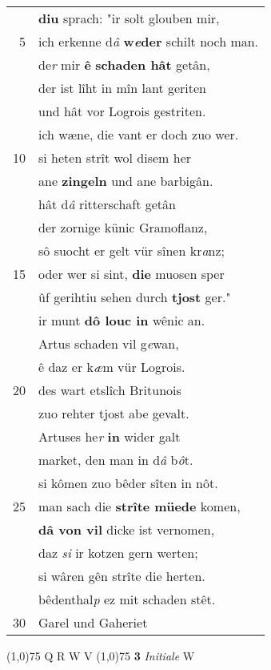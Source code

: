 \documentclass[8pt,a4paper,notitlepage]{article}
\begin{document}
\begin{table}[ht]
\begin{minipage}[t]{0.5\linewidth}
\begin{tabular}{rl}
 & \textbf{diu} sprach: "ir solt glouben mir,\\ 
5 & ich erkenne d\textit{â} \textbf{w\textit{e}der} schilt noch man.\\ 
 & de\textit{r} mir \textbf{ê} \textbf{schaden hât} getân,\\ 
 & der ist lîht in mîn lant geriten\\ 
 & und hât vor Logrois gestriten.\\ 
 & ich wæne, die vant er doch zuo wer.\\ 
10 & si heten strît wol disem her\\ 
 & ane \textbf{zingeln} und ane barbigân.\\ 
 & hât d\textit{â} ritterschaft getân\\ 
 & der zornige künic Gramoflanz,\\ 
 & sô suocht er gelt vür sînen kr\textit{a}nz;\\ 
15 & oder wer si sint, \textbf{die} muosen sper\\ 
 & ûf gerihtiu sehen durch \textbf{tjost} ger."\\ 
 & ir munt \textbf{dô louc in} wênic an.\\ 
 & Artus schaden vil g\textit{e}wan,\\ 
 & ê daz er k\textit{æ}m vür Logrois.\\ 
20 & des wart etslîch Britunois\\ 
 & zuo rehter tjost abe gevalt.\\ 
 & Artuses he\textit{r} \textbf{in} wider galt\\ 
 & market, den man in d\textit{â} b\textit{ô}t.\\ 
 & si kômen zuo bêder sîten in nôt.\\ 
25 & man sach die \textbf{strîte müede} komen,\\ 
 & \textbf{dâ von vil} dicke ist vernomen,\\ 
 & daz \textit{si} ir kotzen gern werten;\\ 
 & si wâren gên strîte die herten.\\ 
 & bêdenthal\textit{p} ez mit schaden stêt.\\ 
30 & Garel und Gaheriet\\ 
\end{tabular}
\scriptsize
\line(1,0){75} \newline
Q R W V \newline
\line(1,0){75} \newline
\textbf{3} \textit{Initiale} W  \newline

\end{minipage}
\end{table}
\end{document}

